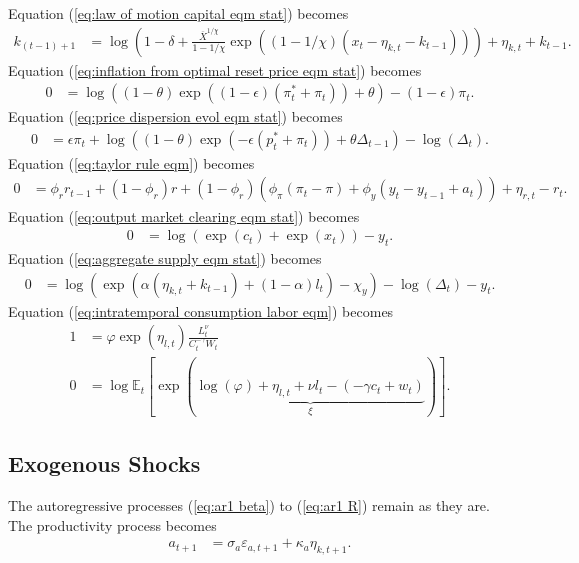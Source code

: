 \documentclass[12 pt, oneside]{article}
\theoremstyle{definition}
\theoremstyle{definition}
\theoremstyle{definition}
\newcommand{\E}{\mathbb{E}}
\begin{document}
Equation (\ref{eq:law of motion capital eqm stat}) becomes
\begin{align*}
  k_{(t - 1) + 1} & = \log\left(1 - \delta + \frac{\overline{X}^{1 / \chi}}{1 - 1 / \chi}\exp((1 - 1 / \chi)(x_t - \eta_{k, t} - k_{t - 1}))\right) + \eta_{k, t} + k_{t - 1}.
\end{align*}
Equation (\ref{eq:inflation from optimal reset price eqm stat}) becomes
\begin{align*}
  0 & = \log\left((1 - \theta)\exp((1 - \epsilon)(\pi_t^* + \pi_t)) + \theta\right) - (1 - \epsilon)\pi_t.
\end{align*}
Equation (\ref{eq:price dispersion evol eqm stat}) becomes
\begin{align*}
  0 & = \epsilon \pi_t + \log((1 - \theta) \exp(-\epsilon(p_t^* + \pi_t)) + \theta \Delta_{t - 1}) - \log(\Delta_t).
\end{align*}
Equation (\ref{eq:taylor rule eqm}) becomes
\begin{align*}
  0 & = \phi_r r_{t - 1} + (1 - \phi_r)r + (1 - \phi_r)(\phi_\pi(\pi_t - \pi) + \phi_y(y_t - y_{t - 1} + a_t)) + \eta_{r, t} - r_t.
\end{align*}
Equation (\ref{eq:output market clearing eqm stat}) becomes
\begin{align*}
  0 & = \log(\exp(c_t) + \exp(x_t)) - y_t.
\end{align*}
Equation (\ref{eq:aggregate supply eqm stat}) becomes
\begin{align*}
  0 & = \log(\exp(\alpha(\eta_{k, t} + k_{t - 1}) + (1 - \alpha) l_t) - \chi_y) - \log(\Delta_t) - y_t.
\end{align*}
Equation (\ref{eq:intratemporal consumption labor eqm}) becomes
\begin{align*}
  1 & = \varphi \exp(\eta_{l, t})\frac{L_t^\nu}{C_t^{-\gamma}W_t}\\
  0 & = \log \E_t\left[\exp\left(\underbrace{\log(\varphi) + \eta_{l, t} + \nu l_t - (- \gamma c_t + w_t)}_{\xi}\right)\right].
\end{align*}

\subsection{Exogenous Shocks}
The autoregressive processes (\ref{eq:ar1 beta}) to (\ref{eq:ar1 R}) remain as they are. The productivity process becomes
\begin{align*}
  a_{t + 1} & = \sigma_a \varepsilon_{a, t + 1} + \kappa_a \eta_{k, t + 1}.
\end{align*}
\end{document}
